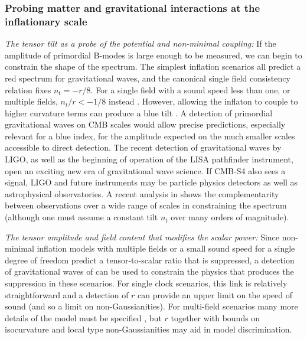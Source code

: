 \subsubsection{Probing matter and gravitational interactions at the inflationary scale}

{\it The tensor tilt as a probe of the potential and non-minimal coupling:} If the amplitude of primordial B-modes is large enough to be measured, we can begin to constrain the shape of the spectrum. The simplest inflation scenarios all predict a red spectrum for gravitational waves, and the canonical single field consistency relation fixes $n_t=-r/8$. For a single field with a sound speed less than one, or multiple fields, $n_t/r<-1/8$ instead \cite{Price:2014ufa}. However, allowing the inflaton to couple to higher curvature terms can produce a blue tilt \cite{Baumann:2015xxa}. A detection of primordial gravitational waves on CMB scales would allow precise predictions, especially relevant for a blue index, for the amplitude expected on the much smaller scales accessible to direct detection. The recent detection of gravitational waves by LIGO, as well as the beginning of operation of the LISA pathfinder instrument, open an exciting new era of gravitational wave science. If CMB-S4 also sees a signal, LIGO and future instruments may be particle physics detectors as well as astrophysical observatories. A recent analysis in \cite{Lasky:2015lej} shows the complementarity between observations over a wide range of scales in constraining the spectrum (although one must assume a constant tilt $n_t$ over many orders of magnitude). 

{\it The tensor amplitude and field content that modifies the scalar power:} Since non-minimal inflation models with multiple fields or a small sound speed for a single degree of freedom predict a tensor-to-scalar ratio that is suppressed, a detection of gravitational waves of can be used to constrain the physics that produces the suppression in these scenarios. For single clock scenarios, this link is relatively straightforward \cite{Baumann:2014cja} and a detection of $r$ can provide an upper limit on the speed of sound (and so a limit on non-Gaussianities). For multi-field scenarios many more details of the model must be specified \cite{Turzynski:2014tza}, but $r$ together with bounds on isocurvature and local type non-Gaussianities may aid in model discrimination. 

